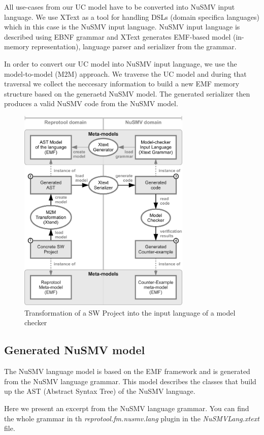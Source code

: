 All use-cases from our UC model have to be converted into NuSMV input language.
We use XText as a tool for handling DSLs (domain specifica languages) which in this case is the NuSMV input language.
NuSMV input language is described using EBNF grammar and XText generates EMF-based model (in-memory representation), language parser and serializer from the grammar.

In order to convert our UC model into NuSMV input language, we use the model-to-model (M2M) approach.
We traverse the UC model and during that traversal we collect the neccesary information to build a new EMF memory structure based on the generaetd NuSMV model.
The generated serializer then produces a valid NuSMV code from the NuSMV model.

\begin{figure}[ht]
  \centering
  \includegraphics[height=280pt]{images/XtextWorkflow}
  \caption{Transformation of a SW Project into the input language of a model checker}
  \label{fig:XtextWorkflow}
\end{figure}
\pagebreak

\subsection{Generated NuSMV model}

The NuSMV language model is based on the EMF framework and is generated from the NuSMV language grammar.
This model describes the classes that build up the AST (Abstract Syntax Tree) of the NuSMV language.

Here we present an excerpt from the NuSMV language grammar. You can find the whole grammar in th
\emph{reprotool.fm.nusmv.lang} plugin in the \emph{NuSMVLang.xtext} file.

